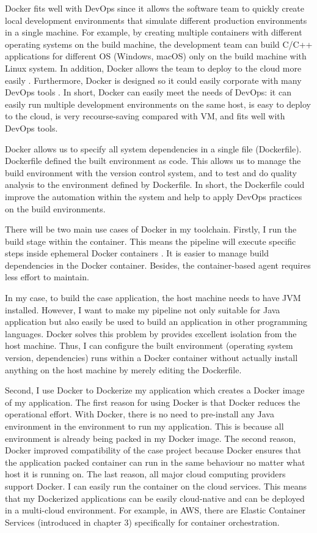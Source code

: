 Docker fits well with DevOps since it allows the software team to quickly create local development environments that simulate different production environments in a single machine. For example, by creating multiple containers with different operating systems on the build machine, the development team can build C/C++ applications for different OS (Windows, macOS) only on the build machine with Linux system.
In addition, Docker allows the team to deploy to the cloud more easily \cite{vaughan2014docker}. Furthermore, Docker is designed so it could easily corporate with many DevOps tools \cite{Whosusin96:online}. In short, Docker can easily meet the needs of DevOps: it can easily run multiple development environments on the same host, is easy to deploy to the cloud, is very recourse-saving compared with VM, and fits well with DevOps tools.
\par
Docker allows us to specify all system dependencies in a single file (Dockerfile). Dockerfile defined the built environment as code. This allows us to manage the build environment with the version control system, and to test and do quality analysis to the environment defined by Dockerfile. In short, the Dockerfile could improve the automation within the system and help to apply DevOps practices on the build environments.
\par
\label{docker}
There will be two main use cases of Docker in my toolchain. Firstly, I run the build stage within the container.
This means the pipeline will execute specific steps inside ephemeral Docker containers \cite{Overview44:online}. It is easier to manage build dependencies in the Docker container. Besides, the container-based agent requires less effort to maintain.
\par
In my case, to build the case application, the host machine needs to have JVM installed. However, I want to make my pipeline not only suitable for Java application but also easily be used to build an application in other programming languages. Docker solves this problem by provides excellent isolation from the host machine. Thus, I can configure the built environment (operating system version, dependencies) runs within a Docker container without actually install anything on the host machine by merely editing the Dockerfile.
\par
Second, I use Docker to Dockerize my application which creates a Docker image of my application. The first reason for using Docker is that Docker reduces the operational effort.
With Docker, there is no need to pre-install any Java environment in the environment to run my application. This is because all environment is already being packed in my Docker image. 
The second reason, Docker improved compatibility of the case project because Docker ensures that the application packed container can run in the same behaviour no matter what host it is running on.
The last reason, all major cloud computing providers support Docker. 
I can easily run the container on the cloud services. This means that my Dockerized applications can be easily cloud-native and can be deployed in a multi-cloud environment. For example, in AWS, there are Elastic Container Services (introduced in chapter 3) specifically for container orchestration.
